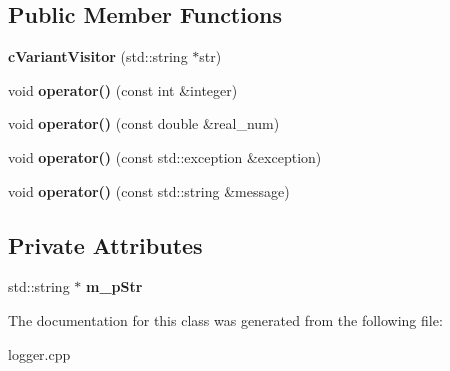 \subsection*{\-Public \-Member \-Functions}
\begin{DoxyCompactItemize}
\item 
\hypertarget{classengine_1_1cVariantVisitor_a4dfcf482b3b84120ab323aa9303058f0}{
{\bfseries c\-Variant\-Visitor} (std\-::string $\ast$str)}
\label{classengine_1_1cVariantVisitor_a4dfcf482b3b84120ab323aa9303058f0}

\item 
\hypertarget{classengine_1_1cVariantVisitor_a194e92aa8a44b02c29dbe14a5a049493}{
void {\bfseries operator()} (const int \&integer)}
\label{classengine_1_1cVariantVisitor_a194e92aa8a44b02c29dbe14a5a049493}

\item 
\hypertarget{classengine_1_1cVariantVisitor_ad72499c182f11280fa498773ffc8bd3c}{
void {\bfseries operator()} (const double \&real\-\_\-num)}
\label{classengine_1_1cVariantVisitor_ad72499c182f11280fa498773ffc8bd3c}

\item 
\hypertarget{classengine_1_1cVariantVisitor_a1f1bc8f29028034cddb07f1781e56e81}{
void {\bfseries operator()} (const std\-::exception \&exception)}
\label{classengine_1_1cVariantVisitor_a1f1bc8f29028034cddb07f1781e56e81}

\item 
\hypertarget{classengine_1_1cVariantVisitor_afdfa31a083e06c49529beeea2557dce4}{
void {\bfseries operator()} (const std\-::string \&message)}
\label{classengine_1_1cVariantVisitor_afdfa31a083e06c49529beeea2557dce4}

\end{DoxyCompactItemize}
\subsection*{\-Private \-Attributes}
\begin{DoxyCompactItemize}
\item 
\hypertarget{classengine_1_1cVariantVisitor_a0392f224211e16af4b2c72afa2df4257}{
std\-::string $\ast$ {\bfseries m\-\_\-p\-Str}}
\label{classengine_1_1cVariantVisitor_a0392f224211e16af4b2c72afa2df4257}

\end{DoxyCompactItemize}


\-The documentation for this class was generated from the following file\-:\begin{DoxyCompactItemize}
\item 
logger.\-cpp\end{DoxyCompactItemize}
